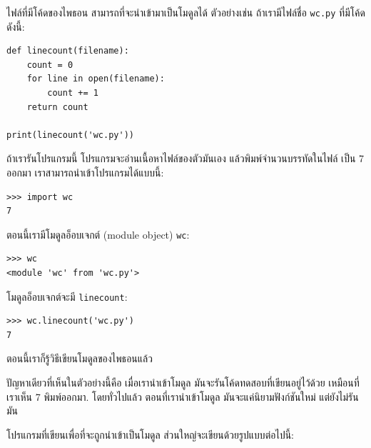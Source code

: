 
ไฟล์ที่มีโค้ดของไพธอน สามารถที่จะนำเข้ามาเป็นโมดูลได้
ตัวอย่างเช่น ถ้าเรามีไฟล์ชื่อ \texttt{wc.py} ที่มีโค้ดดังนี้:

\begin{verbatim}
def linecount(filename):
    count = 0
    for line in open(filename):
        count += 1
    return count

print(linecount('wc.py'))
\end{verbatim}
%
%
ถ้าเรารันโปรแกรมนี้
โปรแกรมจะอ่านเนื้อหาไฟล์ของตัวมันเอง แล้วพิมพ์จำนวนบรรทัดในไฟล์ เป็น 7 ออกมา
เราสามารถนำเข้าโปรแกรมได้แบบนี้:

\begin{verbatim}
>>> import wc
7
\end{verbatim}
%
%
ตอนนี้เรามีโมดูลอ็อบเจกต์ (module object) \texttt{wc}:

\begin{verbatim}
>>> wc
<module 'wc' from 'wc.py'>
\end{verbatim}
%
%
โมดูลอ็อบเจกต์จะมี \verb"linecount":


\begin{verbatim}
>>> wc.linecount('wc.py')
7
\end{verbatim}
%
%
ตอนนี้เราก็รู้วิธีเขียนโมดูลของไพธอนแล้ว

%
ปัญหาเดียวที่เห็นในตัวอย่างนี้คือ 
เมื่อเรานำเข้าโมดูล มันจะรันโค้ดทดสอบที่เขียนอยู่ไว้ด้วย เหมือนที่เราเห็น 7 พิมพ์ออกมา.
โดยทั่วไปแล้ว ตอนที่เรานำเข้าโมดูล
มันจะแค่นิยามฟังก์ชันใหม่ แต่ยังไม่รันมัน


โปรแกรมที่เขียนเพื่อที่จะถูกนำเข้าเป็นโมดูล
ส่วนใหญ่จะเขียนด้วยรูปแบบต่อไปนี้:

